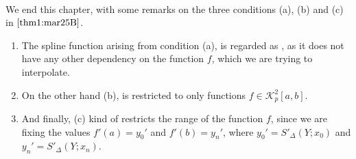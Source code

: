 \ 

We end this chapter, with some remarks on the three conditions (a), (b) and (c) in  $\ref{thm1:mar25B}$.

\begin{rmk}
    \begin{enumerate}[label = (\roman*)]
        \item The spline function arising from condition (a), is regarded as , as it does not have any other dependency on the function $f$, which we are trying to interpolate.
        \item On the other hand (b), is restricted to only functions $f \in \mathcal{K}^2_p[a,b]$.
        \item And finally, (c) kind of restricts the range of the function $f$, since we are fixing the values $f'(a) = y_0' $ and $f'(b) = y_n'$, where $y_0' = S'_{\Delta}(Y; x_0)$ and $y_n' = S'_{\Delta}(Y; x_n)$.
    \end{enumerate}
\end{rmk}

